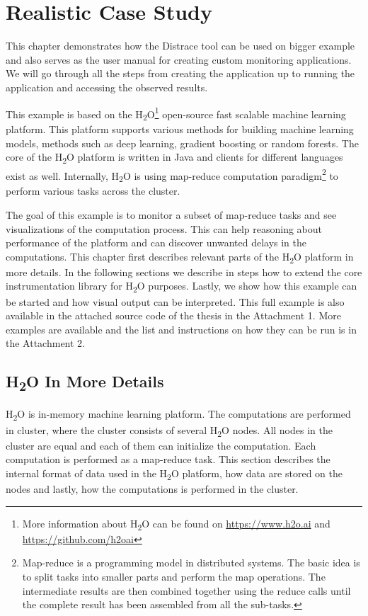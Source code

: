 \chapter{Realistic Case Study}
\label{chap:big_example}
This chapter demonstrates how the Distrace tool can be used on bigger example and also serves as the user manual for creating custom monitoring applications. We will go through all the steps from creating the application up to running the application and accessing the observed results.

This example is based on the H\textsubscript{2}O\footnote{More information about H\textsubscript{2}O can be found on \url{https://www.h2o.ai} and \url{https://github.com/h2oai}} open-source fast scalable machine learning platform. This platform supports various methods for building machine learning models, methods such as deep learning, gradient boosting or random forests. The core of the H\textsubscript{2}O platform is written in Java and clients for different languages exist as well. Internally, H\textsubscript{2}O is using map-reduce computation paradigm\footnote{Map-reduce is a programming model in distributed systems. The basic idea is to split tasks into smaller parts and perform the map operations. The intermediate results are then combined together using the reduce calls until the complete result has been assembled from all the sub-tasks.} to perform various tasks across the cluster.

The goal of this example is to monitor a subset of map-reduce tasks and see visualizations of the computation process. This can help reasoning about performance of the platform and can discover unwanted delays in the computations. This chapter first describes relevant parts of the H\textsubscript{2}O platform in more details. In the following sections we describe in steps how to extend the core instrumentation library for H\textsubscript{2}O purposes. Lastly, we show how this example can be started and how visual output can be interpreted. 
This full example is also available in the attached source code of the thesis in the Attachment 1. More examples are available and the list and instructions on how they can be run is in the Attachment 2.

\section{H\textsubscript{2}O In More Details}
H\textsubscript{2}O is in-memory machine learning platform. The computations are performed in cluster, where the cluster consists of several H\textsubscript{2}O nodes. All nodes in the cluster are equal and each of them can initialize the computation. Each computation is performed as a map-reduce task. This section describes the internal format of data used in the H\textsubscript{2}O platform, how data are stored on the nodes and lastly, how the computations is performed in the cluster. 

